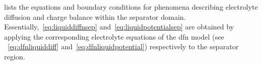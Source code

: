 

    lists   the    equations   and    boundary
conditions   for  phenomena   describing   electrolyte   diffusion  and   charge
balance  within  the   separator  domain.  Essentially,~\cref{eq:liquiddiffnsep}
and~\cref{eq:liquidpotentialsep}  are  obtained  by applying  the  corresponding
electrolyte  equations  of  the \gls{dfn}  model  (see  ~\cref{eq:dfnliquiddiff}
and~\cref{eq:dfnliquidpotential}) respectively to the separator region.
